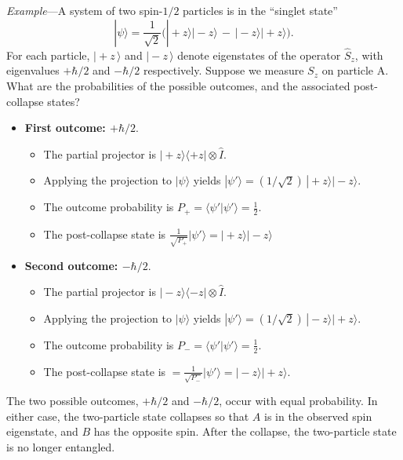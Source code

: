 \documentclass[pra,12pt]{revtex4-2}
\begin{document}
\begin{framed}
\noindent
\textit{Example}---A system of two spin-$1/2$ particles is in
the ``singlet state''
\begin{equation}
  |\psi\rangle = \frac{1}{\sqrt{2}} \Big(|\!+\!z\rangle|\!-\!z\rangle \,-\, |\!-\!z\rangle|\!+\!z\rangle\Big).
\end{equation}
For each particle, $|\!+\!z\,\rangle$ and $|\!-\!z\,\rangle$ denote
eigenstates of the operator $\hat{S}_z$, with eigenvalues $+\hbar/2$
and $-\hbar/2$ respectively.  Suppose we measure $S_z$ on particle A.
What are the probabilities of the possible outcomes, and the
associated post-collapse states?

\begin{itemize}
\item \textbf{First outcome: $+\hbar/2$}.
  \begin{itemize}
  \item The partial projector is $|\!+\!z\rangle\langle+z| \otimes \hat{I}$.
  \item Applying the projection to $|\psi\rangle$ yields
    $|\psi'\rangle = (1/\sqrt{2})\,|\!+\!z\rangle|\!-\!z\rangle$.
  \item The outcome probability is $\displaystyle
    P_+ = \langle \psi'|\psi'\rangle = \frac{1}{2}$.
  \item The post-collapse state is $\displaystyle
    \frac{1}{\sqrt{P_+}} |\psi'\rangle = |\!+\!z\rangle |\!-\!z\rangle$
  \end{itemize}

\item \textbf{Second outcome: $-\hbar/2$}.
  \begin{itemize}
  \item The partial projector is $|\!-\!z\rangle\langle-z| \otimes
    \hat{I}$.
  \item Applying the projection to $|\psi\rangle$ yields
    $|\psi'\rangle = (1/\sqrt{2})\,|\!-\!z\rangle|\!+\!z\rangle$.
  \item The outcome probability is $\displaystyle P_- = \langle \psi'|\psi'\rangle =
    \frac{1}{2}$.
  \item The post-collapse state is $\displaystyle = \frac{1}{\sqrt{P_-}} |\psi'\rangle
    = |\!-\!z\rangle |\!+\!z\rangle$.
  \end{itemize}
\end{itemize}
The two possible outcomes, $+\hbar/2$ and $-\hbar/2$, occur with equal
probability.  In either case, the two-particle state collapses so that
$A$ is in the observed spin eigenstate, and $B$ has the opposite spin.
After the collapse, the two-particle state is no longer entangled.
\end{framed}
\end{document}

